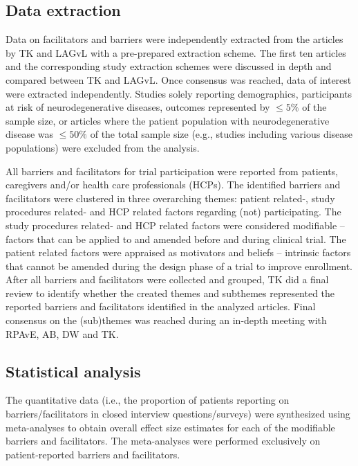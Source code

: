 \documentclass[preprint, 3p,
authoryear]{elsarticle} %
\begin{document}
\hypertarget{data-extraction}{%
\subsection{Data extraction}\label{data-extraction}}

Data on facilitators and barriers were independently extracted from the
articles by TK and LAGvL with a pre-prepared extraction scheme. The
first ten articles and the corresponding study extraction schemes were
discussed in depth and compared between TK and LAGvL. Once consensus was
reached, data of interest were extracted independently. Studies solely
reporting demographics, participants at risk of neurodegenerative
diseases, outcomes represented by \(\leq 5\%\) of the sample size, or
articles where the patient population with neurodegenerative disease was
\(\leq 50\%\) of the total sample size (e.g., studies including various
disease populations) were excluded from the analysis.

All barriers and facilitators for trial participation were reported from
patients, caregivers and/or health care professionals (HCPs). The
identified barriers and facilitators were clustered in three overarching
themes: patient related-, study procedures related- and HCP related
factors regarding (not) participating. The study procedures related- and
HCP related factors were considered modifiable -- factors that can be
applied to and amended before and during clinical trial. The patient
related factors were appraised as motivators and beliefs -- intrinsic
factors that cannot be amended during the design phase of a trial to
improve enrollment. After all barriers and facilitators were collected
and grouped, TK did a final review to identify whether the created
themes and subthemes represented the reported barriers and facilitators
identified in the analyzed articles. Final consensus on the (sub)themes
was reached during an in-depth meeting with RPAvE, AB, DW and TK.

\hypertarget{statistical-analysis}{%
\subsection{Statistical analysis}\label{statistical-analysis}}

The quantitative data (i.e., the proportion of patients reporting on
barriers/facilitators in closed interview questions/surveys) were
synthesized using meta-analyses to obtain overall effect size estimates
for each of the modifiable barriers and facilitators. The meta-analyses
were performed exclusively on patient-reported barriers and
facilitators.
\end{document}
